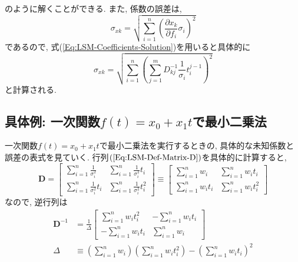 のように解くことができる. 
また, 係数の誤差は, 
\begin{equation}
    \sigma_{xk}
    =
    \sqrt{
        \sum_{i=1}^{n}
        \left(\frac{\partial x_{k}}{\partial f_{i}} \sigma_{i}\right)^{2}
    }
\end{equation}
であるので, 式(\ref{Eq:LSM-Coefficients-Solution})を用いると具体的に
\begin{equation}
    \sigma_{xk}
    =
    \sqrt{
        \sum_{i=1}^{n}
        \left(
            \sum_{j=1}^{m} D_{kj}^{-1}
            \frac{1}{\sigma_{i}} t_{i}^{j-1}
        \right)^{2}
    }
\end{equation}
と計算される. 

\subsection{具体例: 一次関数$f(t) = x_{0} + x_{1} t$で最小二乗法}
一次関数$f(t) = x_{0} + x_{1} t$で最小二乗法を実行するときの, 具体的な未知係数と誤差の表式を見ていく.
行列$(\ref{Eq:LSM-Def-Matrix-D})$を具体的に計算すると, 
\begin{equation}
    \bm{D}
    =
    \begin{bmatrix}
        \sum_{i=1}^{n} \frac{1}{\sigma_{i}^{2}} &
        \sum_{i=1}^{n} \frac{1}{\sigma_{i}^{2}} t_{i}
        \\
        \sum_{i=1}^{n} \frac{1}{\sigma_{i}^{2}} t_{i} &
        \sum_{i=1}^{n} \frac{1}{\sigma_{i}^{2}} t_{i}^{2}
    \end{bmatrix}
    \equiv
    \begin{bmatrix}
        \sum_{i=1}^{n} w_{i} &
        \sum_{i=1}^{n} w_{i} t_{i}
        \\
        \sum_{i=1}^{n} w_{i} t_{i} &
        \sum_{i=1}^{n} w_{i} t_{i}^{2}
    \end{bmatrix}
\end{equation}
なので, 逆行列は
\begin{align}
    \bm{D}^{-1}
    &=
    \frac{1}{\Delta}
    \begin{bmatrix}
        \sum_{i=1}^{n} w_{i} t_{i}^2&
        -\sum_{i=1}^{n} w_{i} t_{i}
        \\
        -\sum_{i=1}^{n} w_{i} t_{i} &
        \sum_{i=1}^{n} w_{i}
    \end{bmatrix}
    \\
    \Delta
    &\equiv
    \left(\sum_{i=1}^{n} w_{i}\right)
    \left(\sum_{i=1}^{n} w_{i} t_{i}^{2}\right)
    -
    \left(\sum_{i=1}^{n} w_{i} t_{i}\right)^{2}
\end{align}
